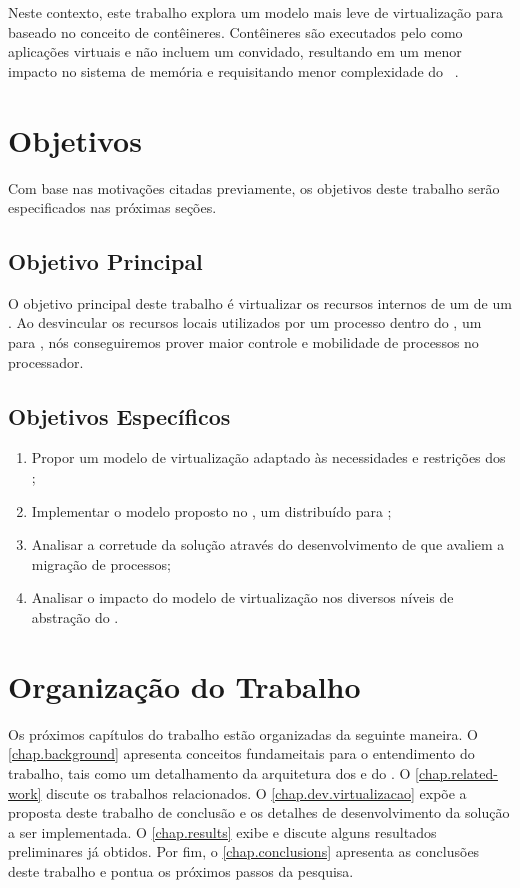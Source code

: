 Neste contexto, este trabalho explora um modelo mais leve de virtualização para \lws baseado no conceito de contêineres. Contêineres são executados pelo \os como aplicações virtuais e não incluem um \os convidado, resultando em um menor impacto no sistema de memória e requisitando menor complexidade do \hardware~\cite{thalheim2018cntr, sharma2016containers}.

\section{Objetivos}
\label{sec.goals}

Com base nas motivações citadas previamente, os objetivos deste trabalho serão especificados nas próximas seções.

\subsection{Objetivo Principal}
\label{sec.goals.primary}

O objetivo principal deste trabalho é virtualizar os recursos internos de um \cluster de um \lw. Ao desvincular os recursos locais utilizados por um processo dentro do \nanvix, um \os para \lws, nós conseguiremos prover maior controle e mobilidade de processos no processador.

\subsection{Objetivos Específicos}
\label{sec.goals.secondary}

\begin{enumerate}[label= (\roman*)]
    \item Propor um modelo de virtualização adaptado às necessidades e restrições dos \lws;
    \item Implementar o modelo proposto no \nanvix, um \so distribuído para \lws;
    \item Analisar a corretude da solução através do desenvolvimento de \benchmarks que avaliem a migração de processos;
    \item Analisar o impacto do modelo de virtualização nos diversos níveis de abstração do \nanvix.
\end{enumerate}

\section{Organização do Trabalho}
\label{sec.organization}

Os próximos capítulos do trabalho estão organizadas da seguinte maneira. O \autoref{chap.background} apresenta conceitos fundameitais para o entendimento do trabalho, tais como um detalhamento da arquitetura dos \lws e do \nanvix. O \autoref{chap.related-work} discute os trabalhos relacionados. O \autoref{chap.dev.virtualizacao} expõe a proposta deste trabalho de conclusão e os detalhes de desenvolvimento da solução a ser implementada. O \autoref{chap.results} exibe e discute alguns resultados preliminares já obtidos. Por fim, o \autoref{chap.conclusions} apresenta as conclusões deste trabalho e pontua os próximos passos da pesquisa.
